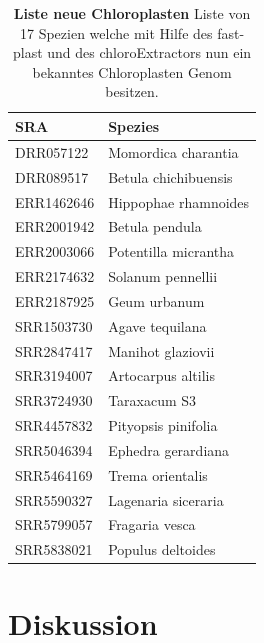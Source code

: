 \documentclass{scrartcl}
\begin{document}
\begin{table}[!h]
\caption[Liste neue Chloroplasten]{\textbf{Liste neue Chloroplasten} Liste von 17 Spezien welche mit Hilfe des fast-plast und des chloroExtractors nun ein bekanntes Chloroplasten Genom besitzen.}
\begin{center}
\begin{tabular}{ll}
SRA & Spezies\\
\hline
DRR057122 & Momordica charantia\\
DRR089517 & Betula chichibuensis\\
ERR1462646 & Hippophae rhamnoides\\
ERR2001942 & Betula pendula\\
ERR2003066 & Potentilla micrantha\\
ERR2174632 & Solanum pennellii\\
ERR2187925 & Geum urbanum\\
SRR1503730 & Agave tequilana\\
SRR2847417 & Manihot glaziovii\\
SRR3194007 & Artocarpus altilis\\
SRR3724930 & Taraxacum S3\\
SRR4457832 & Pityopsis pinifolia\\
SRR5046394 & Ephedra gerardiana\\
SRR5464169 & Trema orientalis\\
SRR5590327 & Lagenaria siceraria\\
SRR5799057 & Fragaria vesca\\
SRR5838021 & Populus deltoides\\
\end{tabular}
\end{center}
\end{table}

\section{Diskussion}
\label{sec-5}
\end{document}
